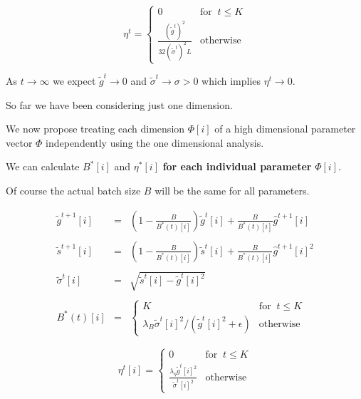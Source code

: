{{

$$\eta^t = \left\{\begin{array}{ll} 0 & \mbox{for}\;\;t \leq K \\ \frac{(\tilde{g}^t)^2}{32(\tilde{\sigma}^t)^2L} & \mbox{otherwise}
\end{array}\right.$$

\vfill
As $t \rightarrow \infty$ we expect $\tilde{g}^t \rightarrow 0$ and $\tilde{\sigma}^t \rightarrow \sigma > 0$ which implies
$\eta^t \rightarrow 0$.


So far we have been considering just one dimension.

\vfill
We now propose treating each dimension $\Phi[i]$ of a high dimensional parameter vector $\Phi$ independently using the one dimensional analysis.

\vfill
We can calculate $B^*[i]$ and $\eta^*[i]$ {\bf for each individual parameter} $\Phi[i]$.

\vfill
Of course the actual batch size $B$ will be the same for all parameters.

\begin{eqnarray*}
  \tilde{g}^{t+1}[i] & = & \left(1-\frac{B}{B^*(t)[i]}\right)\tilde{g}^t[i] + \frac{B}{B^*(t)[i]} \hat{g}^{t+1}[i] \\
  \\
  \tilde{s}^{t+1}[i] & = & \left(1-\frac{B}{B^*(t)[i]}\right)\tilde{s}^t[i] + \frac{B}{B^*(t)[i]} \hat{g}^{t+1}[i]^2 \\
  \\
  \tilde{\sigma}^t[i] & = & \sqrt{\tilde{s}^t[i] - \tilde{g}^t[i]^2} \\
  \\
  B^*(t)[i] &= & \left\{\begin{array}{ll} K & \mbox{for}\;\; t \leq K \\
  \lambda_B\tilde{\sigma}^t[i]^2/(\tilde{g}^t[i]^2 + \epsilon) & \mbox{otherwise} \end{array}\right.
\end{eqnarray*}


$$\eta^t[i] = \left\{\begin{array}{ll} 0 & \mbox{for}\;\;t \leq K \\
        \frac{\lambda_\eta\tilde{g}^t[i]^2}{\tilde{\sigma}^t[i]^2} & \mbox{otherwise}
\end{array}\right.$$

}}
